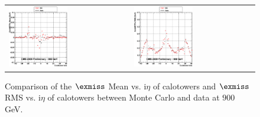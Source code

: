 \begin{figure}[h!]
 \centering
 \begin{tabular}{ll}
  \includegraphics[width=0.5\textwidth]{plots_DataVsMC_MB_900GeV/g_calometPxMean_vs_ieta_900.eps} &
  \includegraphics[width=0.5\textwidth]{plots_DataVsMC_MB_900GeV/g_calometPxRMS_vs_ieta_900.eps} \\
 \end{tabular}
 \caption{\small Comparison of the $\exmiss$ Mean vs. i$\eta$ of calotowers and $\exmiss$ RMS vs. i$\eta$ of calotowers between 
          Monte Carlo and data at $900$ GeV.\label{fig:METx_MeanRMS_vs_ieta_900}}
\end{figure}

